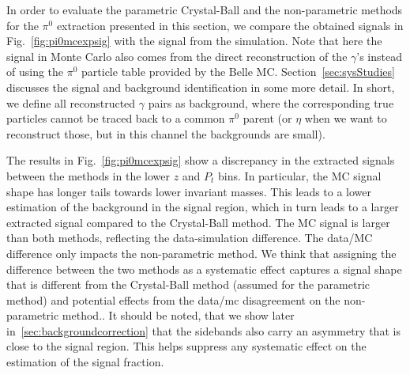 In order to evaluate the parametric Crystal-Ball and the non-parametric methods for the $\pi^0$ extraction presented in this section, we compare the obtained signals in Fig.~\ref{fig:pi0mcexpsig} with the signal from the simulation. 
Note that here the signal in Monte Carlo also comes from the direct reconstruction of the $\gamma$'s instead of using the $\pi^0$ particle table provided by the Belle MC. Section~\ref{sec:sysStudies} discusses the signal and background identification in some more detail. In short, we define all reconstructed $\gamma$ pairs as background, where the corresponding true particles cannot be traced back to a common $\pi^0$ parent (or $\eta$ when we want to reconstruct those, but in this channel the backgrounds are small). 

The results in Fig.~\ref{fig:pi0mcexpsig} show a discrepancy in the extracted signals between the methods in the lower $z$ and $P_t$ bins. In particular, the MC signal shape has longer tails towards lower invariant masses. This leads to a lower estimation of the background in the signal region, which in turn leads to a larger extracted signal compared to the Crystal-Ball method. The MC signal is larger than both methods, reflecting the data-simulation difference. The data/MC difference only impacts the non-parametric method. We think that assigning the difference between the two methods as a systematic effect captures a signal shape that is different from the Crystal-Ball method (assumed for the parametric method) and potential effects from the data/mc disagreement on the non-parametric method.. It should be noted, that we show later in~\ref{sec:backgroundcorrection} that the sidebands also carry an asymmetry that is close to the signal region. This helps suppress any systematic effect on the estimation of the signal fraction.


